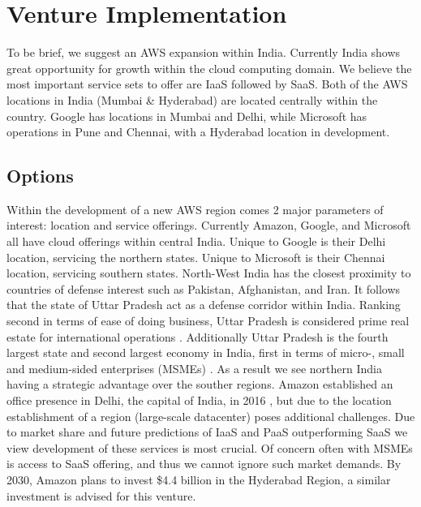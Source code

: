 \documentclass[a4paper, 12pt]{article}
\begin{document}
\section{Venture Implementation}
To be brief, we suggest an AWS expansion within India.
Currently India shows great opportunity for growth within the cloud computing domain.
We believe the most important service sets to offer are IaaS followed by SaaS.
Both of the AWS locations in India (Mumbai \& Hyderabad) are located centrally within the country.
Google has locations in Mumbai and Delhi, while Microsoft has operations in Pune and Chennai, with a Hyderabad location in development.

\subsection{Options}
Within the development of a new AWS region comes 2 major parameters of interest: location and service offerings.
Currently Amazon, Google, and Microsoft all have cloud offerings within central India.
Unique to Google is their Delhi location, servicing the northern states.
Unique to Microsoft is their Chennai location, servicing southern states.
North-West India has the closest proximity to countries of defense interest such as Pakistan, Afghanistan, and Iran.
It follows that the state of Uttar Pradesh act as a defense corridor within India.
Ranking second in terms of ease of doing business, Uttar Pradesh is considered prime real estate for international operations \cite[p.~11]{INDIA_UP_TO_NEW_HEIGHTS}.
Additionally Uttar Pradesh is the fourth largest state and second largest economy in India, first in terms of micro-, small and medium-sided enterprises (MSMEs) \cite[p.~16]{INDIA_DEFENSE_CORRIDOR}.
As a result we see northern India having a strategic advantage over the souther regions.
Amazon established an office presence in Delhi, the capital of India, in 2016 \cite{AMZN_AWS_HYDERABAD}, but due to the location establishment of a region (large-scale datacenter) poses additional challenges.
Due to market share and future predictions of IaaS and PaaS outperforming SaaS we view development of these services is most crucial.
Of concern often with MSMEs is access to SaaS offering, and thus we cannot ignore such market demands.
By 2030, Amazon plans to invest \$4.4 billion in the Hyderabad Region, a similar investment is advised for this venture.

\end{document}
